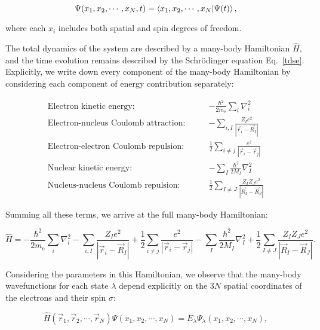 \begin{equation}
    \Psi(x_1,x_2,\cdots,x_N,t)=\braket{x_1,x_2,\cdots,x_N|\Psi(t)},
    \label{many-body_wavefunction}
\end{equation}

where each $x_i$ includes both spatial and spin degrees of freedom.

The total dynamics of the system are described by a many-body Hamiltonian $\hat{H}$, and the time evolution remains described by the Schrödinger equation Eq.~\eqref{tdse}. Explicitly, we write down every component of the many-body Hamiltonian by considering each component of energy contribution separately:

\begin{align}
\text{Electron kinetic energy:}\qquad & -\frac{\hbar^2}{2m_\mathrm{e}}\sum_i\nabla_i^2 \label{electrons_kinetic}\\
\text{Electron-nucleus Coulomb attraction:}\qquad & -\sum_{i,I}\frac{Z_I e^2}{|\vec{r}_i-\vec{R}_I|} \label{electrons_nucleus_Coulomb}\\
\text{Electron-electron Coulomb repulsion:}\qquad & \frac{1}{2}\sum_{i\neq j}\frac{e^2}{|\vec{r}_i-\vec{r}_j|} \label{electrons_Coulomb}\\
\text{Nuclear kinetic energy:}\qquad & -\sum_I\frac{\hbar^2}{2M_I}\nabla_I^2 \label{nucleus_kinetic}\\
\text{Nucleus-nucleus Coulomb repulsion:}\qquad & \frac{1}{2}\sum_{I\neq J}\frac{Z_I Z_J e^2}{|\vec{R}_I-\vec{R}_J|} \label{nucleus_interaction}
\end{align}

Summing all these terms, we arrive at the full many-body Hamiltonian:

\begin{equation}
    \hat{H}=-\frac{\hbar^2}{2m_\mathrm{e}}\sum_i\nabla_i^2
    -\sum_{i,I}\frac{Z_I e^2}{|\vec{r}_i-\vec{R}_I|}
    +\frac{1}{2}\sum_{i\neq j}\frac{e^2}{|\vec{r}_i-\vec{r}_j|}
    -\sum_I\frac{\hbar^2}{2M_I}\nabla_I^2
    +\frac{1}{2}\sum_{I\neq J}\frac{Z_I Z_J e^2}{|\vec{R}_I-\vec{R}_J|}.
    \label{full_many_body_hamiltonian}
\end{equation}

Considering the parameters in this Hamiltonian, we observe that the many-body wavefunctions for each state $\lambda$ depend explicitly on the $3N$ spatial coordinates of the electrons and their spin $\sigma$:

\begin{equation}
    \hat{H}(\vec{r}_1,\vec{r}_2,\cdots,\vec{r}_N)\Psi(x_1,x_2,\cdots,x_N)
    = E_\lambda\Psi_\lambda(x_1,x_2,\cdots,x_N),
    \label{many_body_hamiltonian_argument}
\end{equation}

